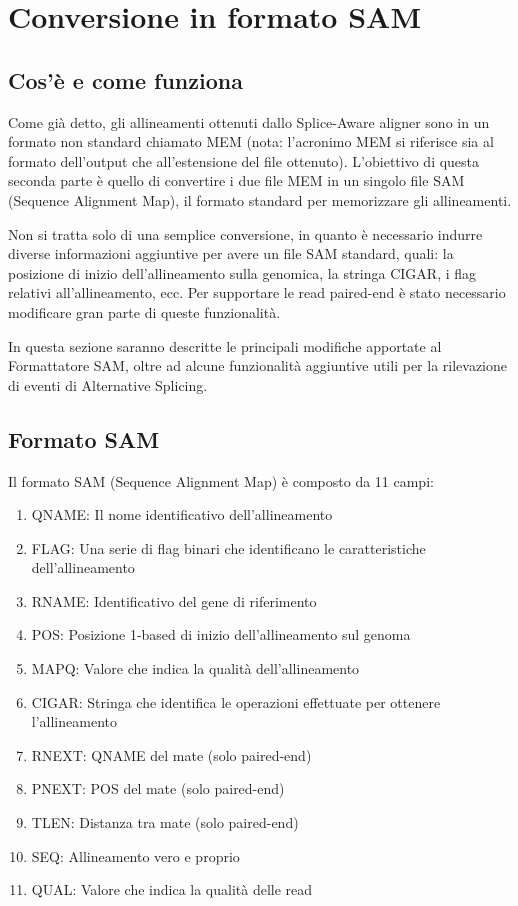 \section{Conversione in formato SAM}

\subsection{Cos'è e come funziona}
Come già detto, gli allineamenti ottenuti dallo Splice-Aware aligner sono in un formato non standard chiamato MEM (nota: l'acronimo MEM si riferisce sia al formato dell'output che all'estensione del file ottenuto). L'obiettivo di questa seconda parte è quello di convertire i due file MEM in un singolo file SAM (Sequence Alignment Map), il formato standard per memorizzare gli allineamenti.

Non si tratta solo di una semplice conversione, in quanto è necessario indurre diverse informazioni aggiuntive per avere un file SAM standard, quali: la posizione di inizio dell'allineamento sulla genomica, la stringa CIGAR, i flag relativi all'allineamento, ecc. Per supportare le read paired-end è stato necessario modificare gran parte di queste funzionalità.

In questa sezione saranno descritte le principali modifiche apportate al Formattatore SAM, oltre ad alcune funzionalità aggiuntive utili per la rilevazione di eventi di Alternative Splicing.

\newpage

\subsection{Formato SAM}
Il formato SAM (Sequence Alignment Map) è composto da 11 campi:

\begin{enumerate}
	\item QNAME: Il nome identificativo dell'allineamento
	\item FLAG: Una serie di flag binari che identificano le caratteristiche dell'allineamento
	\item RNAME: Identificativo del gene di riferimento
	\item POS: Posizione 1-based di inizio dell'allineamento sul genoma
	\item MAPQ:  Valore che indica la qualità dell'allineamento
	\item CIGAR: Stringa che identifica le operazioni effettuate per ottenere l'allineamento
	\item RNEXT: QNAME del mate (solo paired-end)
	\item PNEXT: POS del mate	(solo paired-end)
	\item TLEN:  Distanza tra mate (solo paired-end)
	\item SEQ:  	Allineamento vero e proprio
	\item QUAL: Valore che indica la qualità delle read
\end{enumerate}

